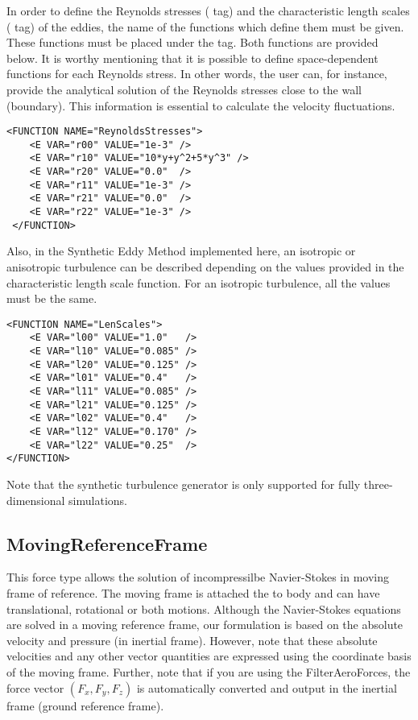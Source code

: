 In order to define the Reynolds stresses ( tag) and the characteristic length scales  ( tag) of the eddies, the name of the functions which define them must be given. These functions must be placed under the    tag. Both functions are provided below. It is worthy mentioning that it is possible to define space-dependent functions for each Reynolds stress. In other words, the user can, for instance, provide the analytical solution of the Reynolds stresses close to the wall (boundary). This information is essential to calculate the velocity fluctuations. 

\begin{lstlisting}[style=XMLStyle] 
<FUNCTION NAME="ReynoldsStresses">
    <E VAR="r00" VALUE="1e-3" /> 
    <E VAR="r10" VALUE="10*y+y^2+5*y^3" />
    <E VAR="r20" VALUE="0.0"  />
    <E VAR="r11" VALUE="1e-3" />
    <E VAR="r21" VALUE="0.0"  />
    <E VAR="r22" VALUE="1e-3" />
 </FUNCTION>
\end{lstlisting}

Also, in the Synthetic Eddy Method implemented here, an isotropic or anisotropic turbulence can be described depending on the values provided in the characteristic length scale function.  For an isotropic turbulence, all the values must be the same.

\begin{lstlisting}[style=XMLStyle] 
<FUNCTION NAME="LenScales">
    <E VAR="l00" VALUE="1.0"   />
    <E VAR="l10" VALUE="0.085" />
    <E VAR="l20" VALUE="0.125" />
    <E VAR="l01" VALUE="0.4"   />
    <E VAR="l11" VALUE="0.085" />
    <E VAR="l21" VALUE="0.125" />
    <E VAR="l02" VALUE="0.4"   />
    <E VAR="l12" VALUE="0.170" />
    <E VAR="l22" VALUE="0.25"  />
</FUNCTION>
\end{lstlisting}

Note that the synthetic turbulence generator is only supported for fully three-dimensional simulations.

\subsection{MovingReferenceFrame}
This force type allows the solution of incompressilbe Navier-Stokes in moving frame of reference. The moving frame is attached the to body and can have translational, rotational or both motions. Although the Navier-Stokes equations are solved in a moving reference frame, our formulation is based on the absolute velocity and pressure (in inertial frame). However, note that these absolute velocities and any other vector quantities are expressed using the coordinate basis of the moving frame. Further, note that if you are using the FilterAeroForces, the force vector $\left(F_x, F_y, F_z\right)$ is automatically converted and output in the inertial frame (ground reference frame).

